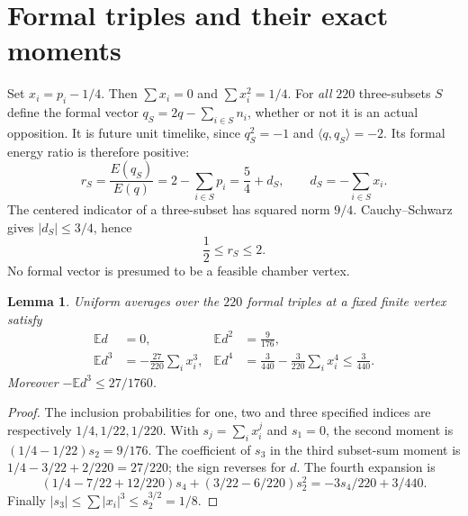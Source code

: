 \documentclass[11pt]{article}
\newtheorem{lemma}[theorem]{Lemma}
\newcommand{\ip}[2]{\langle #1,#2\rangle}
\newcommand{\EE}{\mathbb E}
\begin{document}
\section{Formal triples and their exact moments}
Set $x_i=p_i-1/4$. Then $\sum x_i=0$ and $\sum x_i^2=1/4$.
For \emph{all} $220$ three-subsets $S$ define the formal vector
$q_S=2q-\sum_{i\in S}n_i$, whether or not it is an actual
opposition. It is future unit timelike, since $q_S^2=-1$ and
$\ip{q}{q_S}=-2$. Its formal energy ratio is therefore positive:
\begin{equation}\label{eq:r}
 r_S=\frac{E(q_S)}{E(q)}=2-\sum_{i\in S}p_i
     =\frac54+d_S,\qquad d_S=-\sum_{i\in S}x_i.
\end{equation}
The centered indicator of a three-subset has squared norm $9/4$.
Cauchy--Schwarz gives $|d_S|\le3/4$, hence
\begin{equation}\label{eq:domain}
 \frac12\le r_S\le2.
\end{equation}
No formal vector is presumed to be a feasible chamber vertex.

\begin{lemma}\label{lem:moments}
Uniform averages over the $220$ formal triples at a fixed finite vertex
satisfy
\begin{align*}
 \EE d&=0,&\EE d^2&=\frac9{176},\\
 \EE d^3&=-\frac{27}{220}\sum_i x_i^3,&
 \EE d^4&=\frac3{440}-\frac3{220}\sum_i x_i^4\le\frac3{440}.
\end{align*}
Moreover $-\EE d^3\le27/1760$.
\end{lemma}
\begin{proof}
The inclusion probabilities for one, two and three specified indices
are respectively $1/4,1/22,1/220$. With $s_j=\sum_i x_i^j$ and
$s_1=0$, the second moment is $(1/4-1/22)s_2=9/176$.
The coefficient of $s_3$ in the third subset-sum moment is
$1/4-3/22+2/220=27/220$; the sign reverses for $d$.
The fourth expansion is
\[
 (1/4-7/22+12/220)s_4+(3/22-6/220)s_2^2
 =-3s_4/220+3/440.
\]
Finally $|s_3|\le\sum|x_i|^3\le s_2^{3/2}=1/8$.
\end{proof}
\end{document}
